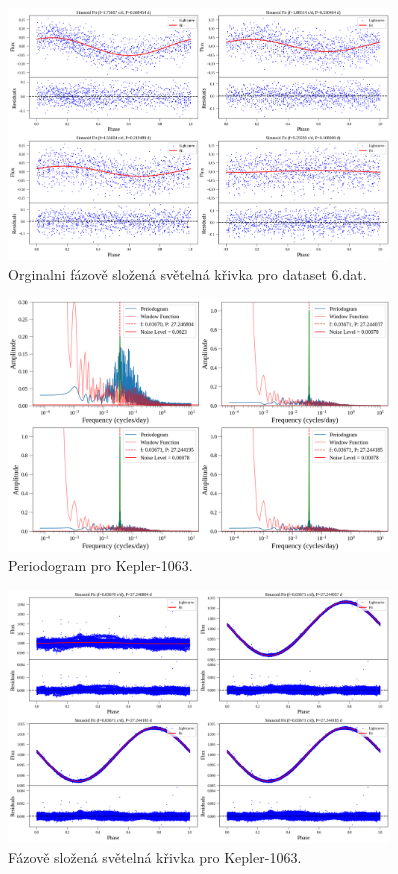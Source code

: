 \documentclass[a4paper,11pt,twocolumn]{article}
\begin{document}
    \begin{figure}
        \centering
        \includegraphics[width=0.9\textwidth]{phase/6_phase_folded_orig.png}
        \caption{Orginalni fázově složená světelná křivka pro dataset 6.dat.}
        \label{fig:6_phase_folded_orig}
    \end{figure}

    \begin{figure}
        \centering
        \includegraphics[width=0.9\textwidth]{period/Kepler-1063_per.png}
        \caption{Periodogram pro Kepler-1063.}
        \label{fig:kplr_per}
    \end{figure}

    \begin{figure}
        \centering
        \includegraphics[width=0.9\textwidth]{phase/Kepler-1063_phase_folded.png}
        \caption{Fázově složená světelná křivka pro Kepler-1063.}
        \label{fig:kplr_phase_folded}
    \end{figure}
\end{document}
